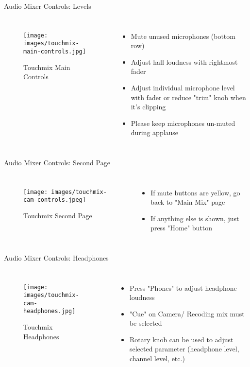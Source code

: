 
\begin{frame}{Audio Mixer Controls: Levels}
	\begin{columns}[T,onlytextwidth]
		\begin{figure} 
			\centering
			\texttt{[image: images/touchmix-main-controls.jpg]}
			\caption{Touchmix Main Controls}
		\end{figure}
		\begin{itemize}
			\item Mute unused microphones (bottom row)
			\item Adjust hall loudness with rightmost fader
			\item Adjust individual microphone level with fader or reduce "trim" knob when it's clipping
			\item Please keep microphones un-muted during applause
		\end{itemize}
	\end{columns}
\end{frame}

\begin{frame}{Audio Mixer Controls: Second Page}
	\begin{columns}[T,onlytextwidth]
		\begin{figure} 
			\centering
			\texttt{[image: images/touchmix-cam-controls.jpeg]}
			\caption{Touchmix Second Page}
		\end{figure}
		\begin{itemize}
			\item If mute buttons are yellow, go back to "Main Mix" page
			\item If anything else is shown, just press "Home" button
		\end{itemize}
	\end{columns}
\end{frame}

\begin{frame}{Audio Mixer Controls: Headphones}
	\begin{columns}[T,onlytextwidth]
		\begin{figure} 
			\centering
			\texttt{[image: images/touchmix-cam-headphones.jpg]}
			\caption{Touchmix Headphones}
		\end{figure}
		\begin{itemize}
			\item Press "Phones" to adjust headphone loudness
			\item "Cue" on Camera/ Recoding mix must be selected
			\item Rotary knob can be used to adjust selected parameter (headphone level, channel level, etc.)
		\end{itemize}
	\end{columns}
\end{frame}
